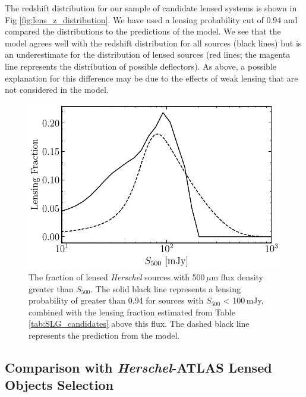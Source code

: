 \documentclass[fleqn,usenatbib]{mnras}
\begin{document}
The redshift distribution for our sample of candidate lensed systems is shown in Fig \ref{fig:lens_z_distribution}. We have used a lensing probability cut of 0.94 and compared the distributions to the predictions of the \citealt{Cai_2013} model. We see that the model agrees well with the redshift distribution for all sources (black lines) but is an underestimate for the distribution of lensed sources (red lines; the magenta line represents the distribution of possible deflectors). As above, a possible explanation for this difference may be due to the effects of weak lensing that are not considered in the \citealt{Cai_2013} model.


\begin{figure}
	\includegraphics[width=\columnwidth]{Fig_12}
	\caption{The fraction of lensed \textit{Herschel} sources with 500\,$\mu$m flux density greater than $S_{500}$. The solid black line represents a lensing probability of greater than 0.94 for sources with $S_{500}$ < 100\,mJy, combined with the lensing fraction estimated from Table \ref{tab:SLG_candidates} above this flux. The dashed black line represents the prediction from the \citealt{Cai_2013} model.}
	\label{fig:lensing_fraction}
\end{figure}


\subsection{Comparison with \textit{Herschel}-ATLAS Lensed Objects Selection}
\label{sec:lensed_redshift}
\end{document}
